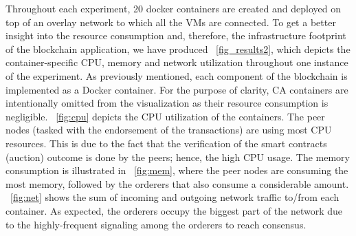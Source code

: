 Throughout each experiment, 20 docker containers are created and deployed on top of an overlay network to which all the \acp{VM} are connected. To get a better insight into the resource consumption and, therefore, the infrastructure footprint of the blockchain application, we have produced \figureautorefname~\ref{fig_results2}, which depicts the container-specific \ac{CPU}, memory and network utilization throughout one instance of the experiment. %
As previously mentioned, each component of the blockchain is implemented as a Docker container. For the purpose of clarity, \ac{CA} containers are intentionally omitted from the visualization as their resource consumption is negligible. 
\figureautorefname~\ref{fig:cpu} depicts the \ac{CPU} utilization of the containers. The peer nodes (tasked with the endorsement of the transactions) are using most \ac{CPU} resources. This is due to the fact that the verification of the smart contracts (auction) outcome is done by the peers; hence, the high \ac{CPU} usage. 
The memory consumption is illustrated in \figureautorefname~\ref{fig:mem}, where the peer nodes are consuming the most memory, followed by the orderers that also consume a considerable amount.
\figureautorefname~\ref{fig:net} shows the sum of incoming and outgoing network traffic to/from each container. As expected, the orderers occupy the biggest part of the network due to the highly-frequent signaling among the orderers to reach consensus. 

